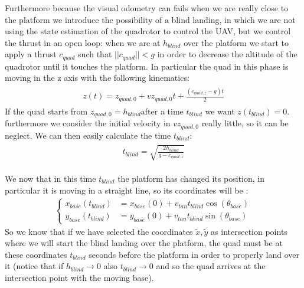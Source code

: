 Furthermore because the visual odometry can fails when we are really close to the platform we introduce the possibility of a blind landing, in which we are not using the state estimation of the quadrotor to control the UAV, but we control the thrust in an open loop: when we are at $h_{blind}$ over the platform we start to apply a thrust $c_{quad}$ such that $||c_{quad}|| < g$ in order to decrease the altitude of the quadrotor until it touches the platform. In particular the quad in this phase is moving in the z axis with the following kinematics:
\begin{align}
\begin{split}
z(t) = z_{quad,0} + vz_{quad,0}t + \frac{(c_{quad,z} - g)t}{2}
\label{eq:z_dynamics}
\end{split}
\end{align}
If the quad starts from $z_{quad,0} = h_{blind}$after a time $t_{blind}$ we want $z(t_{blind}) = 0$. furthermore we consider the initial velocity in $vz_{quad,0}$ really little, so it can be neglect. We can then easily calculate the time $t_{blind}$:
\begin{align}
\begin{split}
t_{blind} = \sqrt{\frac{2h_{blind}}{g-c_{quad,z}}}
\label{eq:z_dynamics}
\end{split}
\end{align}

We now that in this time $t_{blind}$ the platform has changed its position, in particular it is moving in a straight line, so its coordinates will be :
\begin{align}
\begin{cases}
x_{base}(t_{blind}) &= x_{base}(0) + v_{tan}t_{blind}\cos{(\theta_{base})}\\[10pt]
y_{base}(t_{blind}) &= y_{base}(0) + v_{tan}t_{blind}\sin{(\theta_{base})}
\end{cases}
\label{eq:future_pose_blind}
\end{align}
So we know that if we have selected the coordinates $\tilde{x},\tilde{y}$ as intersection points where we will start the blind landing over the platform, the quad must be at these coordinates $t_{blind}$ seconds before the platform in order to properly land over it (notice that if $h_{blind} \rightarrow 0$ also $t_{blind} \rightarrow 0$ and so the quad arrives at the intersection point with the moving base).\\

